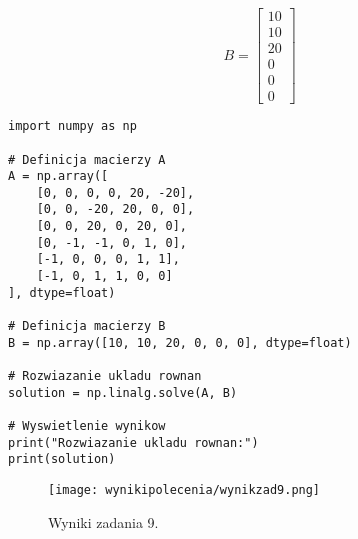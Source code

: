 \documentclass{article}
\begin{document}
\[
B =
\begin{bmatrix}
10 \\
10 \\
20 \\
0 \\
0 \\
0
\end{bmatrix}
\]
\newpage
\begin{lstlisting}
import numpy as np

# Definicja macierzy A
A = np.array([
    [0, 0, 0, 0, 20, -20],
    [0, 0, -20, 20, 0, 0],
    [0, 0, 20, 0, 20, 0],
    [0, -1, -1, 0, 1, 0],
    [-1, 0, 0, 0, 1, 1],
    [-1, 0, 1, 1, 0, 0]
], dtype=float)

# Definicja macierzy B
B = np.array([10, 10, 20, 0, 0, 0], dtype=float)

# Rozwiazanie ukladu rownan
solution = np.linalg.solve(A, B)

# Wyswietlenie wynikow
print("Rozwiazanie ukladu rownan:")
print(solution)
\end{lstlisting}

\begin{figure}[h]
    \centering
    \texttt{[image: wynikipolecenia/wynikzad9.png]}
    \caption{Wyniki zadania 9.}
    \label{zad9wyniki}
\end{figure}
\end{document}
